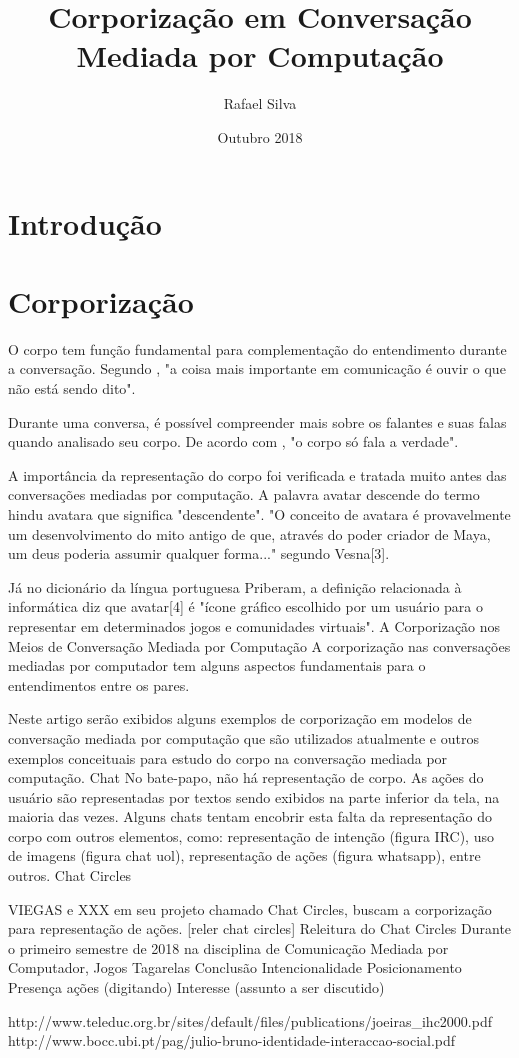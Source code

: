 \documentclass{article}
\title{Corporização em Conversação Mediada por Computação}
\author{Rafael Silva}
\date{Outubro 2018}
\begin{document}
\maketitle

\section{Introdução}



\section{Corporização}

O corpo tem função fundamental para complementação do entendimento durante a conversação. Segundo \cite{}, "a coisa mais importante em comunicação é ouvir o que não está sendo dito".

Durante uma conversa, é possível compreender mais sobre os falantes e suas falas quando analisado seu corpo. De acordo com \cite{}, "o corpo só fala a verdade".

A importância da representação do corpo foi verificada e tratada muito antes das conversações mediadas por computação. A palavra avatar descende do termo hindu avatara que significa "descendente". "O conceito de avatara é provavelmente um desenvolvimento do mito antigo de que, através do poder criador de Maya, um deus poderia assumir qualquer forma..." segundo Vesna[3].

Já no dicionário da língua portuguesa Priberam, a definição relacionada à informática diz que avatar[4] é "ícone gráfico escolhido por um usuário para o representar em determinados jogos e comunidades virtuais".
A Corporização nos Meios de Conversação Mediada por Computação
A corporização nas conversações mediadas por computador tem alguns aspectos fundamentais para o entendimentos entre os pares.

Neste artigo serão exibidos alguns exemplos de corporização em modelos de conversação mediada por computação que são utilizados atualmente e outros exemplos conceituais para estudo do corpo na conversação mediada por computação.
Chat
No bate-papo, não há representação de corpo. As ações do usuário são representadas por textos sendo exibidos na parte inferior da tela, na maioria das vezes. Alguns chats tentam encobrir esta falta da representação do corpo com outros elementos, como: representação de intenção (figura IRC), uso de imagens (figura chat uol), representação de ações (figura whatsapp), entre outros.
Chat Circles

VIEGAS e XXX em seu projeto chamado Chat Circles, buscam a corporização para representação de ações. [reler chat circles]
Releitura do Chat Circles
Durante o primeiro semestre de 2018 na disciplina de Comunicação Mediada por Computador, 
Jogos
Tagarelas
Conclusão
Intencionalidade
Posicionamento
Presença
ações (digitando)
Interesse (assunto a ser discutido)





http://www.teleduc.org.br/sites/default/files/publications/joeiras\_ihc2000.pdf
http://www.bocc.ubi.pt/pag/julio-bruno-identidade-interaccao-social.pdf
\end{document}
